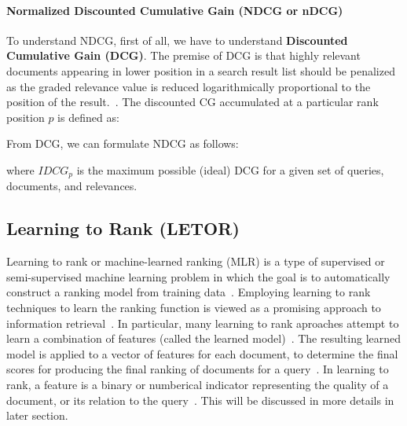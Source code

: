 \paragraph{Normalized Discounted Cumulative Gain (NDCG or nDCG)}
To understand NDCG, first of all, we have to understand \textbf{Discounted Cumulative Gain (DCG)}. 
The premise of DCG is that highly relevant documents appearing in lower position in a search result list should be penalized as the graded relevance value is 
reduced logarithmically proportional to the position of the result.~\cite{ndcg}. The discounted CG accumulated at a particular rank position
$p$ is defined as:

\begin{center}
\end{center}

From DCG, we can formulate NDCG as follows:
\begin{center}
\end{center}
where $IDCG_p$ is the maximum possible (ideal) DCG for a given set of queries, documents, and relevances.


\subsection{Learning to Rank (LETOR)}\label{sec:letor}
Learning to rank or machine-learned ranking (MLR) is a type of supervised or semi-supervised machine learning problem in which the goal is 
to automatically construct a ranking model from training data~\cite{letor}.
Employing learning to rank techniques to learn the ranking function is viewed as
a promising approach to information retrieval~\cite{letor}. In particular, many learning to rank aproaches attempt to learn a combination of features
(called the learned model)~\cite[P. 3]{learningmodel}. The resulting learned model is applied to a vector of features for each document, to determine the final scores for 
producing the final ranking of documents for a query~\cite[P. 3]{learningmodel}. In learning to rank, a feature is a binary or numberical indicator 
representing the quality of a document, or its relation to the query~\cite[P. 4]{learningmodel}. This will be discussed in more details in later section.

